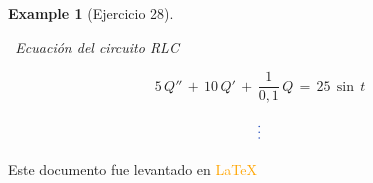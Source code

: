 \documentclass[a4paper,11pt,openany]{book}
\newtheorem{exmp}{Example}[section]
\begin{document}
\begin{exmp}[Ejercicio 28]
 
\ 
 
 
\textcolor{ceruleanblue}{}\, Ecuación del circuito RLC
 
$$5\,Q''\,+\,10\,Q'\,+\,\dfrac{1}{0,1}\,Q\,=\,25\,\sin\,t$$
 
$$\textcolor{ceruleanblue}{\vdots}$$
 
\end{exmp}

Este documento fue levantado en \textcolor{orange}{\LaTeX}
 
\end{document}
